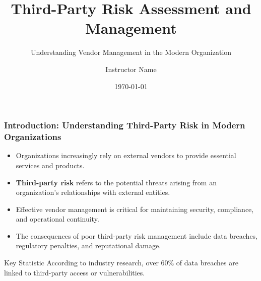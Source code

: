 \documentclass{beamer}
\title{Third-Party Risk Assessment and Management}
\subtitle{Understanding Vendor Management in the Modern Organization}
\author{Instructor Name}
\institute{School/College Name}
\date{\today}
\begin{document}
\begin{frame}
    \titlepage
\end{frame}

\begin{frame}
    \frametitle{Introduction: Understanding Third-Party Risk in Modern Organizations}
    
    \begin{itemize}
        \item Organizations increasingly rely on external vendors to provide essential services and products.
        \item \textbf{Third-party risk} refers to the potential threats arising from an organization's relationships with external entities.
        \item Effective vendor management is critical for maintaining security, compliance, and operational continuity.
        \item The consequences of poor third-party risk management include data breaches, regulatory penalties, and reputational damage.
    \end{itemize}
    
    \begin{alertblock}{Key Statistic}
        According to industry research, over 60\% of data breaches are linked to third-party access or vulnerabilities.
    \end{alertblock}
\end{frame}
\end{document}
